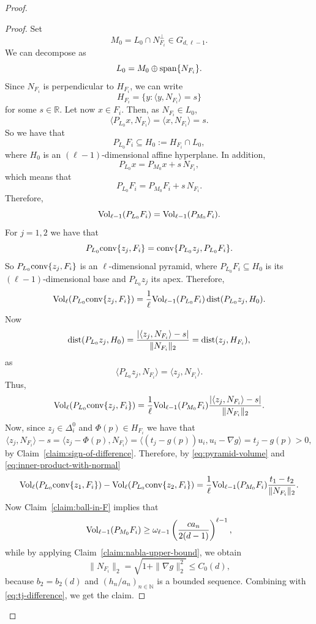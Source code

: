 \documentclass[10pt]{amsart}
\newcommand{\1}{\textbf{1}}
\newcommand{\conv}{{\rm conv}}
\newcommand{\vol}{{\rm Vol}}
\newcommand{\dist}{{\rm dist}}
\numberwithin{equation}{section} %
\theoremstyle{remark}
\theoremstyle{definition}
\begin{document}
\begin{proof}
     \begin{proof}
         Set \[M_0= L_0 \cap N_{F_i}^\perp \in G_{d,\ell-1}.\] We can decompose as \[L_0=M_0 \oplus {\rm span} \{N_{F_i}\}.\] Since $N_{F_i}$ is perpendicular to $H_{F_i}$, we can write \[H_{F_i}=\{y: \langle y, N_{F_i} \rangle =s\}\] for some $s \in \mathbb{R}$. Let now $x \in F_i$. Then, as $N_{F_i} \in L_0$, \[ \langle P_{L_0}x, N_{F_i} \rangle= \langle x, N_{F_i} \rangle =s.\] So we have that \[P_{L_0}F_i \subseteq  H_0:= H_{F_i} \cap L_0,\] where $H_0$ is an $(\ell-1)$-dimensional affine hyperplane. In addition, \[P_{L_0}x=P_{M_0}x+ s\,N_{F_i},\] which means that \[P_{L_0}F_i=P_{M_0}F_i+s\,N_{F_i}.\] Therefore, \[\vol_{\ell-1}(P_{L_0}F_i) =\vol_{\ell-1}(P_{M_0}F_i).\] For $j=1,2$ we have that \[P_{L_0}\conv\{z_j,F_i\}=\conv\{P_{L_0}z_j,P_{L_0}F_i\}.\] So $P_{L_0}\conv\{z_j,F_i\}$ is an $\ell$-dimensional pyramid, where $P_{L_0}F_i \subseteq H_0$ is its $(\ell-1)$-dimensional base and $P_{L_0}z_j$ its apex. Therefore, \[\vol_\ell(P_{L_0}\conv\{z_j,F_i\})=\frac{1}{\ell}\vol_{\ell-1}(P_{L_0}F_i)\, \dist(P_{L_0}z_j,H_0) .\] Now \[\dist(P_{L_0}z_j,H_0)= \frac{|\langle z_j,N_{F_i}\rangle-s|}{\|N_{F_i}\|_2}=\dist(z_j,H_{F_i}),\] as \[\langle P_{L_0} z_j, N_{F_i} \rangle =\langle z_j, N_{F_i}\rangle.\] Thus, 
         \begin{equation}\label{eq:pyramid-volume}    
         \vol_\ell(P_{L_0}\conv\{z_j,F_i\})=\frac{1}{\ell} \vol_{\ell-1}(P_{M_0}F_i) \frac{|\langle z_j,N_{F_i}\rangle-s|}{\|N_{F_i}\|_2}.
          \end{equation}
         Now, since $z_j \in \Delta_i^0$ and $\Phi(p) \in H_{F_i}$ we have that \begin{equation}\label{eq:inner-product-with-normal}\langle z_j,N_{F_i} \rangle -s= \langle z_j-\Phi(p), N_{F_i} \rangle=\langle (t_j-g(p))u_i,u_i-\nabla g\rangle=t_j-g(p)>0,
         \end{equation} by Claim~\ref{claim:sign-of-difference}. Therefore, by \eqref{eq:pyramid-volume} and \eqref{eq:inner-product-with-normal} \[\vol_{\ell}(P_{L_0} \conv\{z_1,F_i\}) - \vol_{\ell}(P_{L_0} \conv\{z_2,F_i\})=\frac{1}{\ell} \vol_{\ell-1}(P_{M_0}F_i) \frac{t_1-t_2}{\|N_{F_i}\|_2}.\] Now Claim~\ref{claim:ball-in-F} implies that \[\vol_{\ell-1}(P_{M_0}F_i)\geq \omega_{\ell-1}\left(\frac{ca_n}{2(d-1)}\right)^{\ell-1},\] while by applying Claim~\ref{claim:nabla-upper-bound}, we obtain \[\|N_{F_i}\|_2 =\sqrt{1+\|\nabla g\|_2^2 } \leq C_0(d),\] because $b_2=b_2(d)$ and $(h_n/a_n)_{n \in \mathbb{N}}$ is a bounded sequence. Combining with \eqref{eq:tj-difference}, we get the claim.
     \end{proof}


\end{proof}
\end{document}
